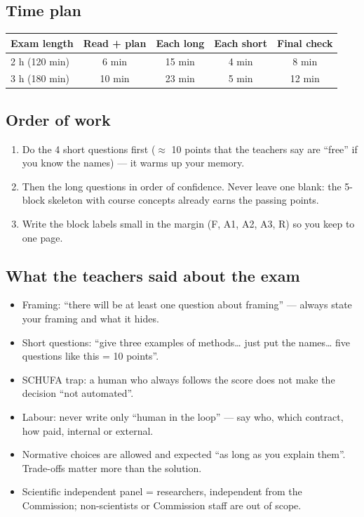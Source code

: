 \documentclass[11pt,a4paper]{article}
\begin{document}
\subsection*{Time plan}\begin{tabular}{lcccc}\toprule \textbf{Exam length} & \textbf{Read + plan} & \textbf{Each long} & \textbf{Each short} & \textbf{Final check}\\\midrule
2 h (120 min) & 6 min & 15 min & 4 min & 8 min\\
3 h (180 min) & 10 min & 23 min & 5 min & 12 min\\
\bottomrule\end{tabular}
\subsection*{Order of work}\begin{enumerate}\item Do the 4 short questions first ($\approx$ 10 points that the teachers say are “free” if you know the names) — it warms up your memory.\item Then the long questions in order of confidence. Never leave one blank: the 5-block skeleton with course concepts already earns the passing points.\item Write the block labels small in the margin (F, A1, A2, A3, R) so you keep to one page.\end{enumerate}
\subsection*{What the teachers said about the exam}\begin{itemize}\item Framing: “there will be at least one question about framing” — always state your framing and what it hides.\item Short questions: “give three examples of methods… just put the names… five questions like this = 10 points”.\item SCHUFA trap: a human who always follows the score does not make the decision “not automated”.\item Labour: never write only “human in the loop” — say who, which contract, how paid, internal or external.\item Normative choices are allowed and expected “as long as you explain them”. Trade-offs matter more than the solution.\item Scientific independent panel = researchers, independent from the Commission; non-scientists or Commission staff are out of scope.\end{itemize}
\end{document}
